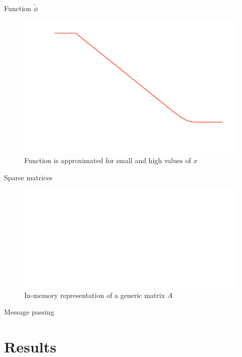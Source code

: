 \documentclass{beamer}
\begin{document}
\begin{darkframes}
  \begin{frame}{Function $\tilde{\phi}$}
    \begin{figure}[h]
      \centering
      \includegraphics[width=\textwidth]{../plots/figures/phi_tilde.pdf}
      \caption{Function is approximated for small and high values of $x$}
      \label{fig:phi_tilde}
    \end{figure}
  \end{frame}

  \begin{frame}{Sparse matrices}
    \begin{figure}[h]
      \centering
      \includegraphics[width=\textwidth]{figures/sparse-matrix.eps}
      \caption{In-memory representation of a generic matrix $A$}
      \label{fig:phi_tilde}
    \end{figure}
  \end{frame}

  \begin{frame}{Message passing}
  \end{frame}

  \section{Results}

\end{darkframes}
\end{document}
